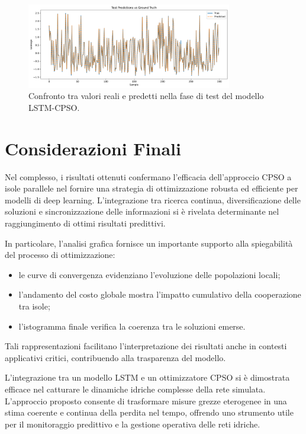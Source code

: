 \documentclass{article}
\begin{document}
\begin{figure}[H]
    \centering
    \includegraphics[width=0.8\textwidth]{img/Test Predict.png}
    \caption{Confronto tra valori reali e predetti nella fase di test del modello LSTM-CPSO.}
    \label{fig:test_predict}
\end{figure}

\section{Considerazioni Finali}

Nel complesso, i risultati ottenuti confermano l’efficacia dell’approccio CPSO a isole parallele nel fornire una 
strategia di ottimizzazione robusta ed efficiente per modelli di deep learning. L’integrazione tra ricerca continua, 
diversificazione delle soluzioni e sincronizzazione delle informazioni si è rivelata determinante nel raggiungimento 
di ottimi risultati predittivi.

In particolare, l’analisi grafica fornisce un importante supporto alla spiegabilità del processo di ottimizzazione: 
\begin{itemize}
    \item le curve di convergenza evidenziano l’evoluzione delle popolazioni locali;
    \item l’andamento del costo globale mostra l’impatto cumulativo della cooperazione tra isole;
    \item l’istogramma finale verifica la coerenza tra le soluzioni emerse.
\end{itemize}
Tali rappresentazioni facilitano l’interpretazione dei risultati anche in contesti applicativi critici, 
contribuendo alla trasparenza del modello.

L’integrazione tra un modello LSTM e un ottimizzatore CPSO si è dimostrata efficace nel catturare le 
dinamiche idriche complesse della rete simulata. L’approccio proposto consente di trasformare misure 
grezze eterogenee in una stima coerente e continua della perdita nel tempo, offrendo uno strumento utile 
per il monitoraggio predittivo e la gestione operativa delle reti idriche.
\end{document}
